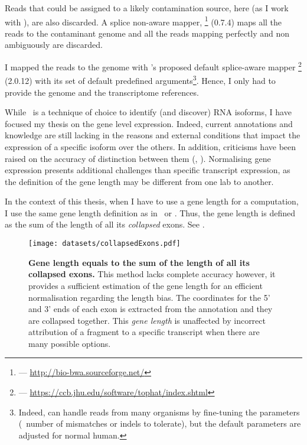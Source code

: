 Reads that could be assigned to a likely contamination source, here
 (as I work with ),
are also discarded. A splice non-aware mapper,
\footnote{ --- \href{http://bio-bwa.sourceforge.net/}%
{http://bio-bwa.sourceforge.net/}} (0.7.4) maps all the reads to the contaminant
genome and all the reads mapping perfectly and non ambiguously are discarded.

I mapped the reads to the genome with \irap's proposed default splice-aware mapper
\footnote{ ---
\href{https://ccb.jhu.edu/software/tophat/index.shtml}%
{https://ccb.jhu.edu/software/tophat/index.shtml}} (2.0.12) 
with its set of default predefined arguments\footnote{Indeed,  can
handle reads from many organisms by fine-tuning the parameters (\eg\ number
of mismatches or indels to tolerate), but the default parameters are adjusted
for normal human.}. Hence, I only had to provide the
genome and the transcriptome references.


While \Rnaseq\ is a technique of choice to identify (and discover) \gls{RNA}
isoforms, I have focused my thesis on the gene level expression. Indeed, current
annotations and knowledge are still lacking in the reasons and
external conditions that impact the expression of a specific isoform over the
others. In addition, criticisms have been raised on the accuracy of distinction
between them (\cite{tamaraRNA}, \cite{ernestRNA}). Normalising gene expression
presents additional challenges than specific transcript expression,
as the definition of the gene length may be different from one lab to another.

In the context of this thesis, when I have to use a gene length for a computation,
I use the same gene length definition as in
\irap\ or \egxa. Thus, the gene length is defined as the sum of the length of
all its \emph{collapsed} exons. See .

\begin{figure}
    \texttt{[image: datasets/collapsedExons.pdf]}\centering
        \caption[Gene length equals to the sum of the length of all its collapsed
        exons]{\label{fig:Genelength-collapsedExons}\textbf{Gene length equals to
        the sum of the length of all its collapsed exons.} This method lacks
        complete accuracy however, it provides a sufficient estimation of the
        gene length for an efficient normalisation regarding the length bias.
        The coordinates for the 5' and 3' ends of each exon is extracted from
        the annotation and they are collapsed together. This \emph{gene length}
        is unaffected by incorrect attribution of a fragment to a
        specific transcript when there are many possible options.}
    \end{figure}

